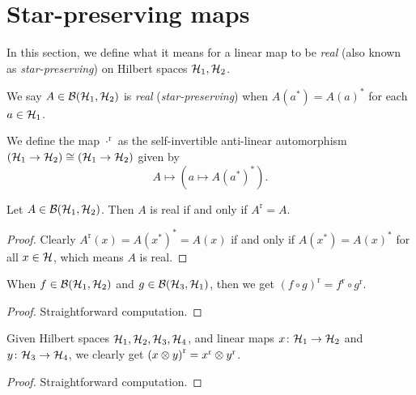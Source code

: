 \chapter{Star-preserving maps}
 In this section, we define what it means for a linear map to be \textit{real} (also known as \textit{star-preserving}) on Hilbert spaces $\mathcal{H}_1,\mathcal{H}_2$.
 
 \begin{definition}\label{LinearMap.IsReal}\leanok
  We say $A\in\mathcal{B}(\mathcal{H}_1,\mathcal{H}_2)$ is \textit{real} (\textit{star-preserving}) when $A(a^*)={A(a)}^*$ for each $a\in\mathcal{H}_1$.
 \end{definition}
 
 \begin{definition}\label{LinearMap.real}\leanok
  We define the map $\cdot^{\operatorname{r}}$ as the self-invertible anti-linear automorphism $(\mathcal{H}_1\to\mathcal{H}_2)\cong(\mathcal{H}_1\to\mathcal{H}_2)$ given by
  \[A\mapsto(a\mapsto{A(a^*)}^*).\]
 \end{definition}

 \begin{lemma}\label{LinearMap.isReal_iff}\leanok
  Let $A\in\mathcal{B}(\mathcal{H}_1,\mathcal{H}_2)$. Then $A$ is real if and only if $A^{\operatorname{r}}=A$.
 \end{lemma}
 \begin{proof}\leanok
  Clearly $A^{\operatorname{r}}(x)={A(x^*)}^*=A(x)$ if and only if $A(x^*)={A(x)}^*$ for all $x\in\mathcal{H}$, which means $A$ is real.
 \end{proof}

 \begin{lemma}\label{LinearMap.real_comp}\leanok
  When $f\in\mathcal{B}(\mathcal{H}_1,\mathcal{H}_2)$ and $g\in\mathcal{B}(\mathcal{H}_3,\mathcal{H}_1)$, then we get ${(f\circ g)}^{\operatorname{r}}={f^{\operatorname{r}}}\circ{{g^{\operatorname{r}}}}$.
 \end{lemma}
 \begin{proof}\leanok
  Straightforward computation.
 \end{proof}

 \begin{lemma}\label{TensorProduct.map_real}\leanok
  Given Hilbert spaces $\mathcal{H}_1,\mathcal{H}_2,\mathcal{H}_3,\mathcal{H}_4$, and linear maps $x\colon\mathcal{H}_1\to\mathcal{H}_2$ and $y\colon\mathcal{H}_3\to\mathcal{H}_4$, we clearly get ${(x\otimes y)}^{\operatorname{r}}={x}^{\operatorname{r}}\otimes{y}^{\operatorname{r}}$.
 \end{lemma}
 \begin{proof}\leanok
  Straightforward computation.
 \end{proof}

